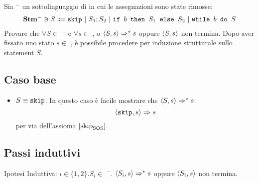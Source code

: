 \newcommand{\stmm}{\stm$^{-}$}

{Sia \stmm{} un sottolinguaggio di \stm{} in cui le assegnazioni sono state
rimosse:
\begin{align*}
\mbox{\stmm} \ni{} S \Coloneqq{}  \skipForFriends\ | \ 
                                  S_1; S_2\ | \ 
                                  \ifABC{b}{S_1}{S_2}\ | \ 
                                  \wbS{b}{S}
\end{align*}
Provare che $\forall{S} \in$ \stmm{} e $\forall{s} \in$ \states, o
$\langle{}S, s\rangle{} \Rightarrow^{*} s$ oppure $\langle{}S, s\rangle{}$ non termina.
}
{}
Dopo aver fissato uno stato $s \in$ \states, è possibile procedere per
induzione strutturale sullo statement $S$.

\subsection{Caso base}

\begin{itemize}
  \item $S \equiv{} \textrm{\normalfont{\texttt{skip}}}$. In questo caso è facile mostrare che
    $\langle{}S, s\rangle{} \Rightarrow^{*} s$:
$$
\langle{}\textrm{\normalfont{\texttt{skip}}}, s\rangle{} \Rightarrow^{} s
$$
per via dell'assioma $ [ \textrm{\normalfont{skip}} ^ \textrm{\normalfont{}} _\textrm{\normalfont{SOS}} ] $.
\end{itemize}

\subsection{Passi induttivi}

Ipotesi Induttiva: $i \in \{1,2\}.S_i \in$ \stmm.
$\langle{}S_i, s\rangle{} 
\Rightarrow^{*} s$ oppure $\langle{}S_i, s\rangle{}$ non termina.

